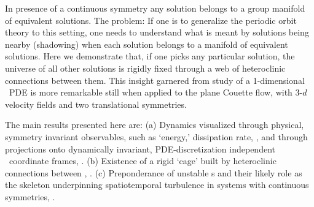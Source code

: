 In presence of a continuous symmetry any solution belongs to a group
manifold of equivalent solutions. The problem: If one is to
generalize the periodic orbit theory to this setting, one needs to
understand what is meant by solutions being nearby (shadowing) when
each solution belongs to a manifold of equivalent solutions.  Here we demonstrate that,  if one picks any
particular solution, the universe of all other solutions is rigidly
fixed through a web of heteroclinic connections between them. This
insight garnered from study of a 1-dimensional \KS\ PDE is more
remarkable still when applied to the plane Couette flow,
with 3-$d$ velocity fields and two translational symmetries.


The main results presented here are: (a) Dynamics visualized through
physical, symmetry invariant observables, such as `energy,'
dissipation rate, \etc,
and through
projections onto dynamically invariant, PDE-discretization
independent \statesp\ coordinate frames, . (b)
Existence of a rigid `cage' built by heteroclinic connections
between \eqva, . (c) Preponderance of
unstable \rpo s and their likely role as the skeleton underpinning
spatiotemporal turbulence in systems with continuous symmetries,
.
